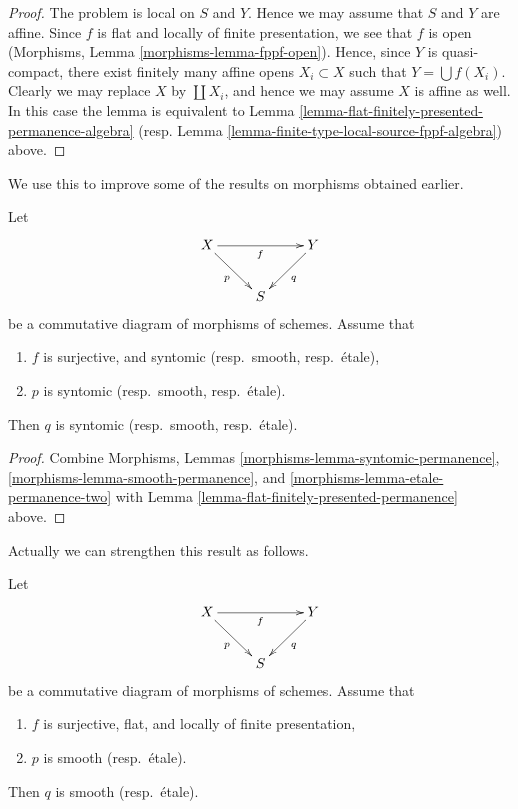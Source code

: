 \begin{proof}
The problem is local on $S$ and $Y$. Hence we may assume that
$S$ and $Y$ are affine. Since $f$ is flat and locally of finite
presentation, we see that $f$ is open
(Morphisms, Lemma \ref{morphisms-lemma-fppf-open}).
Hence, since $Y$ is quasi-compact, there exist finitely many affine opens
$X_i \subset X$ such that $Y = \bigcup f(X_i)$.
Clearly we may replace $X$ by $\coprod X_i$, and hence we
may assume $X$ is affine as well.
In this case the lemma is equivalent to
Lemma \ref{lemma-flat-finitely-presented-permanence-algebra}
(resp. Lemma \ref{lemma-finite-type-local-source-fppf-algebra})
above.
\end{proof}

\noindent
We use this to improve some of the results on morphisms
obtained earlier.

\begin{lemma}
\label{lemma-syntomic-smooth-etale-permanence}
Let
$$
\xymatrix{
X \ar[rr]_f \ar[rd]_p & &
Y \ar[dl]^q \\
& S
}
$$
be a commutative diagram of morphisms of schemes. Assume that
\begin{enumerate}
\item $f$ is surjective, and syntomic (resp.\ smooth, resp.\ \'etale),
\item $p$ is syntomic (resp.\ smooth, resp.\ \'etale).
\end{enumerate}
Then $q$ is syntomic (resp.\ smooth, resp.\ \'etale).
\end{lemma}

\begin{proof}
Combine Morphisms, Lemmas
\ref{morphisms-lemma-syntomic-permanence}, 
\ref{morphisms-lemma-smooth-permanence}, and
\ref{morphisms-lemma-etale-permanence-two}
with Lemma \ref{lemma-flat-finitely-presented-permanence} above.
\end{proof}

\noindent
Actually we can strengthen this result as follows.

\begin{lemma}
\label{lemma-smooth-permanence}
Let
$$
\xymatrix{
X \ar[rr]_f \ar[rd]_p & &
Y \ar[dl]^q \\
& S
}
$$
be a commutative diagram of morphisms of schemes. Assume that
\begin{enumerate}
\item $f$ is surjective, flat, and locally of finite presentation,
\item $p$ is smooth (resp.\ \'etale).
\end{enumerate}
Then $q$ is smooth (resp.\ \'etale).
\end{lemma}

